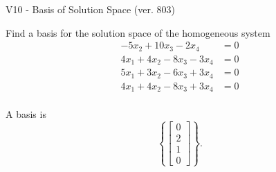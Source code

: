 \begin{exercise}
  \begin{exerciseTitle}V10 - Basis of Solution Space (ver. 803)\end{exerciseTitle}
  \begin{exerciseStatement}
    Find a basis for the solution space of the homogeneous system 
\begin{align*}
 -5 x_ 2 + 10 x_ 3 -2 x_ 4 &= 0  \\ 
  4 x_ 1 + 4 x_ 2 -8 x_ 3 -3 x_ 4 &= 0  \\ 
  5 x_ 1 + 3 x_ 2 -6 x_ 3 + 3 x_ 4 &= 0  \\ 
  4 x_ 1 + 4 x_ 2 -8 x_ 3 + 3 x_ 4 &= 0  \\ 
 \end{align*}


 
  \end{exerciseStatement}

  \begin{exerciseAnswer}
   A basis is   
\[\left\{\left[\begin{array}{c}
0 \\
2 \\
1 \\
0
\end{array}\right]\right\}.\]

  


  \end{exerciseAnswer}
\end{exercise}